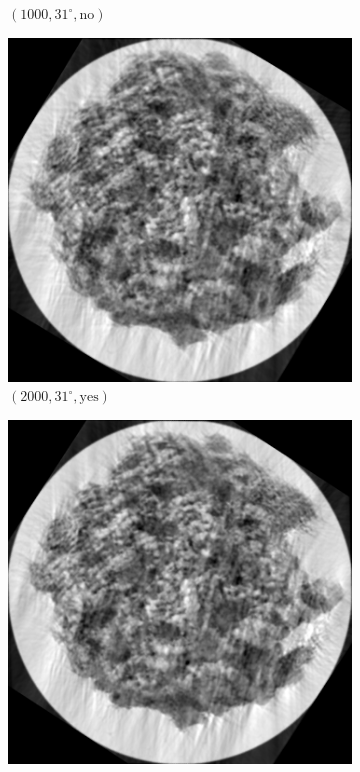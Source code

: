 \documentclass[a4paper, landscape]{article}
\begin{document}
\begin{figure}[H]
\begin{subfigure}{0.13\linewidth}
		\caption{$(1000, 31^\circ, \text{no})$}
	\end{subfigure}
	\begin{subfigure}{0.13\linewidth}
		\centering
		\includegraphics[width=\linewidth]{results/cryoem, N = 2000, reflected and rotated by angle = 31.png}
		\caption{$(2000, 31^\circ, \text{yes})$}
	\end{subfigure}
	\begin{subfigure}{0.13\linewidth}
		\centering
		\includegraphics[width=\linewidth]{results/cryoem, N = 5000, reflected and rotated by angle = 33.png}

\end{subfigure}
\end{figure}
\end{document}
